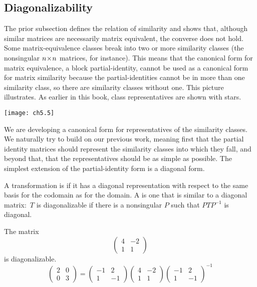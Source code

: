 \subsection{Diagonalizability}
The prior subsection defines the relation of similarity and shows that,
although similar matrices are necessarily matrix equivalent, the converse
does not hold.
Some matrix-equivalence classes break into two or more similarity 
classes (the nonsingular $n \! \times \! n$ matrices, for instance).
This means that the canonical form for matrix equivalence, 
a block partial-identity, cannot be used as a canonical form 
for matrix similarity because
the partial-identities cannot be in more than one
similarity class, so there are similarity classes without one.
This picture illustrates.
As earlier in this book, class representatives are shown with stars.
\begin{center}
  \texttt{[image: ch5.5]}
\end{center}
We are developing a canonical form for representatives of
the similarity classes.
We naturally try to build on our previous work, meaning 
first that the partial identity matrices should represent the similarity
classes into which they fall, 
and beyond that, that the representatives should be as simple as possible. 
The simplest extension of the partial-identity form is a diagonal form.

\begin{definition}
A transformation is %
if it has a diagonal representation
with respect to the same basis for the codomain as for the domain.
A 
is one that is similar to a diagonal matrix:~\( T \) is diagonalizable
if there is a nonsingular \( P \) such that \( PTP^{-1} \) is diagonal.
\end{definition}

\begin{example} \label{ex:DiagTwoByTwo}
The matrix 
\begin{equation*}
  \begin{pmatrix} 
     4 &-2 \\ 
     1 &1 
  \end{pmatrix}
\end{equation*} 
is diagonalizable.
\begin{equation*}
  \begin{pmatrix}
     2  &0   \\
     0  &3
  \end{pmatrix}
  =
  \begin{pmatrix}
    -1  &2  \\
     1  &-1
  \end{pmatrix}
  \begin{pmatrix}
     4  &-2 \\
     1  &1
  \end{pmatrix}
  \begin{pmatrix}
    -1  &2  \\
     1  &-1
  \end{pmatrix}^{-1}
\end{equation*}
\end{example}

